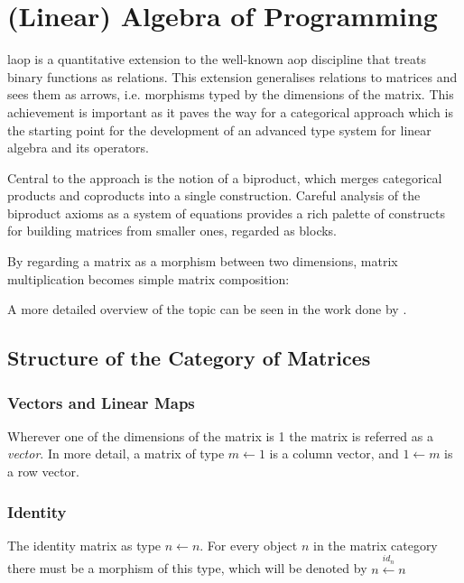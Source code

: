 \documentclass[
  oneside,
  11pt, a4paper,
  footinclude=true,
  headinclude=true,
  cleardoublepage=empty
]{scrbook}
\theoremstyle{definition}
\theoremstyle{definition}
\begin{document}
    \section{(Linear) Algebra of Programming}
    
    \gls{laop} is a quantitative extension to the well-known \gls{aop} discipline that treats binary functions as relations. This extension generalises relations to matrices and sees them as arrows, i.e. morphisms typed by the dimensions of the matrix. This achievement is important as it paves the way for a categorical approach which is the starting point for the development of an advanced type system for linear algebra and its operators.
    
    Central to the approach is the notion of a biproduct, which merges categorical products and coproducts into a single construction. Careful analysis of the biproduct axioms as a system of equations provides a rich palette of constructs for building matrices from smaller ones, regarded as blocks.
    
    By regarding a matrix as a morphism between two dimensions, matrix multiplication becomes simple matrix composition:
    
    \begin{center}
    \end{center}
    
    A more detailed overview of the topic can be seen in the work done by \cite{Macedo2012MatricesAA}. 
    
        \subsection{Structure of the Category of Matrices}
        
            \subsubsection{Vectors and Linear Maps} Wherever one of the dimensions of the matrix is 1 the matrix is referred as a \emph{vector}. In more detail, a matrix of type $m \leftarrow 1$ is a column vector, and $1 \leftarrow m$ is a row vector.
            
            \subsubsection{Identity} The identity matrix as type $n \leftarrow n$. For every object $n$ in the matrix category there must be a morphism of this type, which will be denoted by $n \xleftarrow{id_n} n$
            
\end{document}
